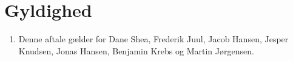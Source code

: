 \section{Gyldighed}
\begin{enumerate}
\item{Denne aftale gælder for Dane Shea, Frederik Juul, Jacob Hansen, Jesper Knudsen, Jonas Hansen,
Benjamin Krebs og Martin Jørgensen.}
\end{enumerate}
